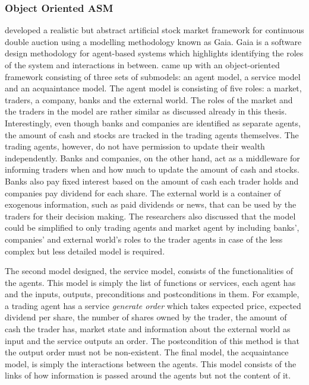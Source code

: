 \subsubsection{Object Oriented ASM}
\citet{Ben12} developed a realistic but abstract artificial stock market 
framework for continuous double auction using a modelling methodology known as 
Gaia. Gaia is a software design methodology for agent-based systems which 
highlights identifying the roles of the system and interactions in between. 
\citeauthor{Ben12} came up with an object-oriented framework consisting of three sets of submodels: 
an agent model, a service model and an acquaintance model. The agent model is consisting of 
five roles: a market, traders, a company, banks and the external world. 
The roles of the market and the traders in the model are rather similar 
as discussed already in this thesis. Interestingly, even though banks and 
companies are identified as separate agents, the amount of cash and stocks 
are tracked in the trading agents themselves. The trading agents, however, do not have permission 
to update their wealth independently. Banks and companies, on the other hand, act 
as a middleware for informing traders when and how much to update the amount of cash 
and stocks. Banks also pay fixed interest based on the amount of cash each trader 
holds and companies pay dividend for each share. The external world is a container of 
exogenous information, such as paid dividends or news, that can be used by the 
traders for their decision making. The researchers also discussed that the model 
could be simplified to only trading agents and market agent by including banks', 
companies' and external world's roles to the trader agents in case of the less complex but 
less detailed model is required.

The second model \citeauthor{Ben12} designed, the service model, 
consists of the functionalities of the agents. This model is simply the list of 
functions or services, each agent has and the inputs, outputs, preconditions and postconditions 
in them. For example, a trading agent has a service \textit{generate order} which takes 
expected price, expected dividend per share, the number of shares owned by the trader, 
the amount of cash the trader has, market state and information about the external world as input 
and the service outputs an order. The postcondition of this method is that the output order 
must not be non-existent. The final model, the acquaintance model, is simply the interactions 
between the agents. This model consists of the links of how information is passed around the 
agents but not the content of it.

